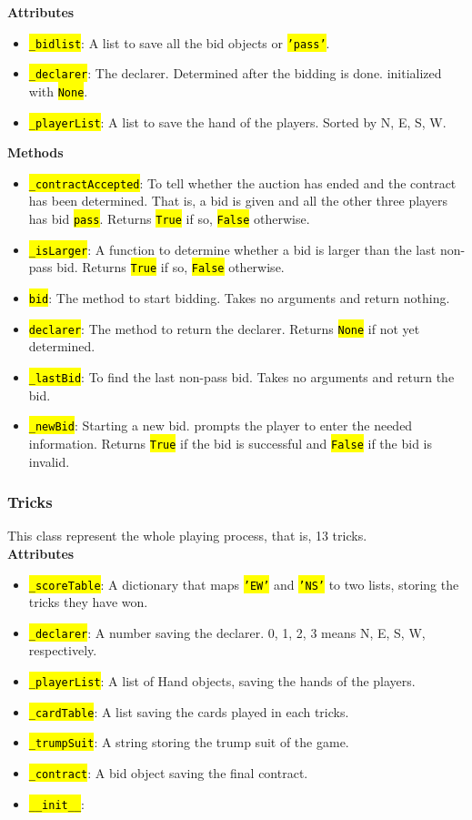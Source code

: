 \documentclass[12pt]{article}
\newcommand{\code}[1]{\texttt{\hl{#1}}}
\begin{document}
\textbf{Attributes}
\begin{itemize}
	\item \code{\_bidlist}: A list to save all the bid objects or \code{'pass'}.
	\item \code{\_declarer}: The declarer. Determined after the bidding is done.
		initialized with \code{None}.
	\item \code{\_playerList}: A list to save the hand of the players. Sorted
		by N, E, S, W.
\end{itemize}
\textbf{Methods}
\begin{itemize}
	\item \code{\_contractAccepted}: To tell whether the auction has ended and
		the contract has been determined. That is, a bid is given and all the
		other three players has bid \code{pass}. Returns \code{True} if so, 
		\code{False} otherwise.
	\item \code{\_isLarger}: A function to determine whether a bid is larger 
		than the last non-pass bid. Returns \code{True} if so, \code{False}
		otherwise.
	\item \code{bid}: The method to start bidding. Takes no arguments and 
		return nothing.
	\item \code{declarer}: The method to return the declarer. Returns \code{None}
		if not yet determined.
	\item \code{\_lastBid}: To find the last non-pass bid. Takes no arguments
		and return the bid.
	\item \code{\_newBid}: Starting a new bid. prompts the player to enter
		the needed information. Returns \code{True} if the bid is successful and
		\code{False} if the bid is invalid.

\end{itemize}




\subsubsection{Tricks}%
\label{ssub:tricks}

This class represent the whole playing process, that is, 13 tricks.\\

\textbf{Attributes}
\begin{itemize}
	\item \code{\_scoreTable}: A dictionary that maps \code{'EW'} and \code{'NS'}
		to two lists, storing the tricks they have won.
	\item \code{\_declarer}: A number saving the declarer. 0, 1, 2, 3 means N,
		E, S, W, respectively.
	\item \code{\_playerList}: A list of Hand objects, saving the hands of the
		players.
	\item \code{\_cardTable}: A list saving the cards played in each tricks.
	\item \code{\_trumpSuit}: A string storing the trump suit of the game.
	\item \code{\_contract}: A bid object saving the final contract.
	\item \code{\_\_init\_\_}: 
\end{itemize}
\end{document}
